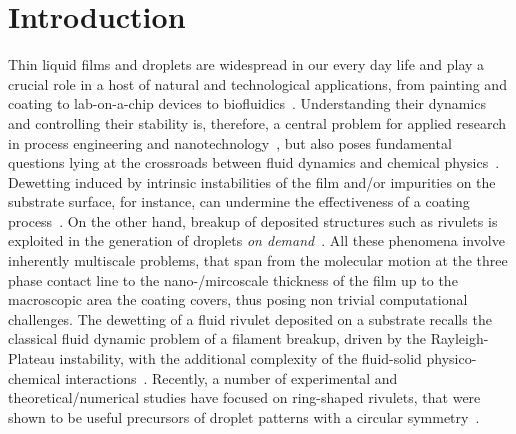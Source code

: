 \documentclass[%
 aip,
 amsmath,amssymb,
 reprint,%
]{revtex4-1}
\begin{document}
\maketitle

\section{Introduction}
\label{sec:intro}
\noindent Thin liquid films and droplets are widespread in our every day life and play a crucial role in a host of natural and technological applications, from painting and coating to lab-on-a-chip devices to biofluidics~\cite{degennesCapillarityWettingPhenomena2004, ronsinPhaseFieldSimulationsMorphology2022,fockeLabonaFoilMicrofluidicsThin2010}.
Understanding their dynamics and controlling their stability is, therefore, a central problem for applied research in process engineering and nanotechnology~\cite{singhInkjetPrintingProcess2010, quereFluidCoatingFiber1999, utadaDrippingJettingDrops2007}, but also poses fundamental questions lying at the crossroads between fluid dynamics and chemical physics~\cite{oronLongscaleEvolutionThin1997, beckerComplexDewettingScenarios2003, thielePatternedDepositionMoving2014, wilczekSlidingDropsEnsemble2017, peschkaSignaturesSlipDewetting2019}.
Dewetting induced by intrinsic instabilities of the film and/or impurities on the substrate surface, for instance, can undermine the effectiveness of a coating process~\cite{bonnWettingSpreading2009, chenWrinklingInstabilitiesPolymer2012}. 
On the other hand, breakup of deposited structures such as rivulets is exploited in the generation of droplets {\it on demand}~\cite{nguyenCompetitionCollapseBreakup2012, PhysRevLett.133.214003}.
All these phenomena involve inherently multiscale problems, that span from the molecular motion at the three phase contact line to the nano-/mircoscale thickness of the film up to the macroscopic area the coating covers, thus posing non trivial computational challenges.
The dewetting of a fluid rivulet deposited on a substrate recalls the classical fluid dynamic problem of a filament breakup, driven by the Rayleigh-Plateau instability, with the additional complexity of the fluid-solid physico-chemical interactions~\cite{diezBreakupFluidRivulets2009, diezStabilityFinitelengthRivulet2009, diezInstabilityTransverseLiquid2012}.
Recently,  a number of experimental and theoretical/numerical studies have focused on ring-shaped rivulets, that were shown to be useful precursors of droplet patterns with a circular symmetry~\cite{nguyenCompetitionCollapseBreakup2012, gonzalezStabilityLiquidRing2013, wuCompetingLiquidPhase2011, edwardsControllingBreakupToroidal2021}. 
\end{document}
